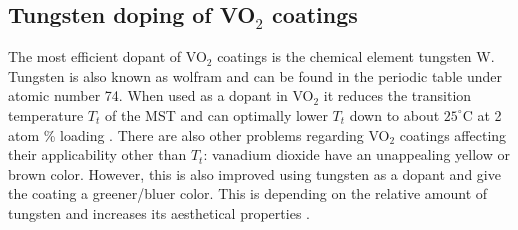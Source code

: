 \subsection{Tungsten doping of VO$_2$ coatings} \label{sec:vo2}
The most efficient dopant of VO$_2$ coatings is the chemical element tungsten W. 
Tungsten is also known as wolfram and can be found in the periodic table
under atomic number 74. When used as a dopant in VO$_2$ it reduces the transition temperature $T_t$
of the MST and can optimally lower $T_t$ down to about $25^{\circ}$C at 2 atom \% loading
\cite[p.~4566]{Blackman2009}. 
%
There are also other problems regarding VO$_2$ coatings affecting their applicability other than $T_t$: 
vanadium dioxide have an unappealing yellow or brown color. However, this is also improved using
tungsten as a dopant and give the coating a greener/bluer color. This is depending on the relative
amount of tungsten and increases its aesthetical properties \cite[p.~4565,4569]{Blackman2009}.


